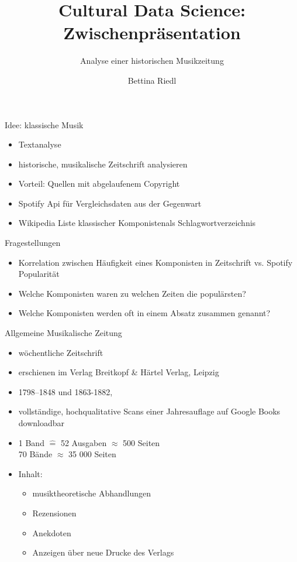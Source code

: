 \documentclass[aspectratio=169]{beamer}
\subtitle{Analyse einer historischen Musikzeitung}
\title{Cultural Data Science: Zwischenpräsentation}
\author{Bettina Riedl}
\begin{document}
\begin{frame}[plain]
    \maketitle
\end{frame}
\note{}
\begin{frame}{Idee: klassische Musik}
	\begin{itemize}
		\pause
		 \item Textanalyse
		\pause
		\item historische, musikalische Zeitschrift analysieren
		\pause
		\item Vorteil: Quellen mit abgelaufenem Copyright
		\pause
		\item Spotify Api für Vergleichsdaten aus der Gegenwart
		\pause
		\item Wikipedia \glqq Liste klassischer Komponisten\grqq als Schlagwortverzeichnis
	\end{itemize}
\begin{block}{Fragestellungen}
	\begin{itemize}
		\item Korrelation zwischen Häufigkeit eines Komponisten in Zeitschrift vs. Spotify Popularität
		\item Welche Komponisten waren zu welchen Zeiten die populärsten?
		\item Welche Komponisten werden oft in einem Absatz zusammen genannt?
	\end{itemize}
\end{block}
\end{frame}
\begin{frame}{Allgemeine Musikalische Zeitung}
	\begin{itemize}
		\item wöchentliche Zeitschrift
		\item erschienen im Verlag \glqq Breitkopf \& Härtel Verlag\grqq, Leipzig
		\item 1798–1848 und 1863-1882,  
		\item vollständige, hochqualitative Scans einer Jahresauflage auf Google Books downloadbar
		\item 1 Band $\widehat{=}$ 52 Ausgaben $\approx$ 500 Seiten\\
		70 Bände $\approx$ 35 000 Seiten
		\item Inhalt: 
		\begin{itemize}
			\item musiktheoretische Abhandlungen
			\item Rezensionen
			\item Anekdoten
			\item Anzeigen über neue Drucke des Verlags
		\end{itemize}
	\end{itemize}
\end{frame}
\end{document}
